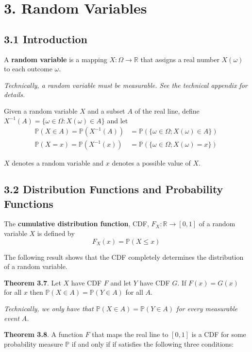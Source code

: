 \section*{3. Random Variables}\label{random-variables}

\subsection*{3.1 Introduction}\label{introduction}

A \textbf{random variable} is a mapping \(X : \Omega \rightarrow \mathbb{R}\) that assigns a real number \(X(\omega)\) to each outcome \(\omega\).

\emph{Technically, a random variable must be measurable. See the technical appendix for details.}

Given a random variable \(X\) and a subset \(A\) of the real line, define \(X^{-1}(A) = \{ \omega \in \Omega : X(\omega) \in A \}\) and let
\begin{align*}
\mathbb{P}(X \in A) = \mathbb{P}(X^{-1}(A)) 
&= \mathbb{P}(\{ \omega \in \Omega; X(\omega) \in A \}) 
\\
\mathbb{P}(X = x) = \mathbb{P}(X^{-1}(x)) 
&= \mathbb{P}(\{ \omega \in \Omega; X(\omega) = x \})
\end{align*}

\(X\) denotes a random variable and \(x\) denotes a possible value of \(X\).

\subsection*{3.2 Distribution Functions and Probability Functions}\label{distribution-functions-and-probability-functions}

The \textbf{cumulative distribution function}, CDF, \(F_X : \mathbb{R} \rightarrow [0, 1]\) of a random variable \(X\) is defined by
\[
F_X(x) = \mathbb{P}(X \leq x) 
\]

The following result shows that the CDF completely determines the distribution of a random variable.

\textbf{Theorem 3.7}. Let \(X\) have CDF \(F\) and let \(Y\) have CDF \(G\). If \(F(x) = G(x)\) for all \(x\) then \(\mathbb{P}(X \in A) = \mathbb{P}(Y \in A)\) for all \(A\).

\emph{Technically, we only have that \(\mathbb{P}(X \in A) = \mathbb{P}(Y \in A)\) for every measurable event \(A\).}

\textbf{Theorem 3.8}. A function \(F\) that maps the real line to \([0, 1]\) is a CDF for some probability measure \(\mathbb{P}\) if and only if if satisfies the following three conditions:

